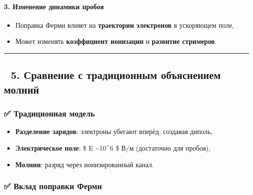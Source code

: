 \documentclass[11pt]{article}
\providecommand{\tightlist}{%
      \setlength{\itemsep}{0pt}\setlength{\parskip}{0pt}}
\begin{document}
\paragraph{\texorpdfstring{3. \textbf{Изменение динамики
пробоя}}{3. Изменение динамики пробоя}}\label{ux438ux437ux43cux435ux43dux435ux43dux438ux435-ux434ux438ux43dux430ux43cux438ux43aux438-ux43fux440ux43eux431ux43eux44f}

\begin{itemize}
\tightlist
\item
  Поправка Ферми влияет на \textbf{траектории электронов} в ускоряющем
  поле,
\item
  Может изменять \textbf{коэффициент ионизации} и \textbf{развитие
  стримеров}.
\end{itemize}

\begin{center}\rule{0.5\linewidth}{\linethickness}\end{center}

\subsection{🔹 5. Сравнение с традиционным объяснением
молний}\label{ux441ux440ux430ux432ux43dux435ux43dux438ux435-ux441-ux442ux440ux430ux434ux438ux446ux438ux43eux43dux43dux44bux43c-ux43eux431ux44aux44fux441ux43dux435ux43dux438ux435ux43c-ux43cux43eux43bux43dux438ux439}

\subsubsection{✅ Традиционная
модель}\label{ux442ux440ux430ux434ux438ux446ux438ux43eux43dux43dux430ux44f-ux43cux43eux434ux435ux43bux44c}

\begin{itemize}
\tightlist
\item
  \textbf{Разделение зарядов}: электроны убегают вперёд, создавая
  диполь,
\item
  \textbf{Электрическое поле}: \$ E \sim 10\^{}6 \$ В/м (достаточно для
  пробоя),
\item
  \textbf{Молнии}: разряд через ионизированный канал.
\end{itemize}

\subsubsection{✅ Вклад поправки
Ферми}\label{ux432ux43aux43bux430ux434-ux43fux43eux43fux440ux430ux432ux43aux438-ux444ux435ux440ux43cux438}
\end{document}
